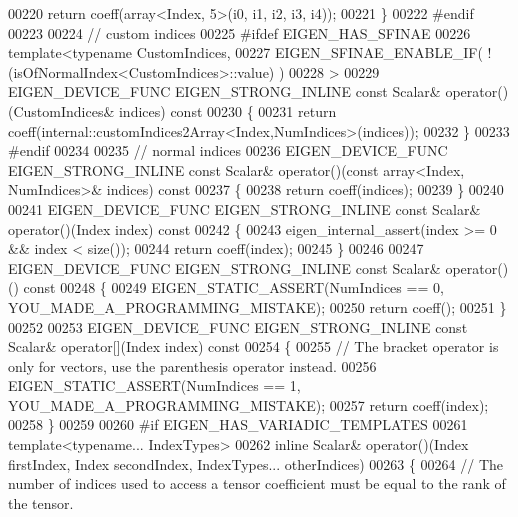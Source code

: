 \begin{DoxyCode}
00220       \textcolor{keywordflow}{return} coeff(array<Index, 5>(i0, i1, i2, i3, i4));
00221     \}
00222 \textcolor{preprocessor}{#endif}
00223 
00224     \textcolor{comment}{// custom indices}
00225 \textcolor{preprocessor}{#ifdef EIGEN\_HAS\_SFINAE}
00226     \textcolor{keyword}{template}<\textcolor{keyword}{typename} CustomIndices,
00227              EIGEN\_SFINAE\_ENABLE\_IF( !(isOfNormalIndex<CustomIndices>::value) )
00228     >
00229     EIGEN\_DEVICE\_FUNC EIGEN\_STRONG\_INLINE \textcolor{keyword}{const} Scalar& operator()(CustomIndices& indices)\textcolor{keyword}{ const}
00230 \textcolor{keyword}{    }\{
00231         \textcolor{keywordflow}{return} coeff(internal::customIndices2Array<Index,NumIndices>(indices));
00232     \}
00233 \textcolor{preprocessor}{#endif}
00234 
00235     \textcolor{comment}{// normal indices}
00236     EIGEN\_DEVICE\_FUNC EIGEN\_STRONG\_INLINE \textcolor{keyword}{const} Scalar& operator()(\textcolor{keyword}{const} array<Index, NumIndices>& indices)\textcolor{keyword}{
       const}
00237 \textcolor{keyword}{    }\{
00238       \textcolor{keywordflow}{return} coeff(indices);
00239     \}
00240 
00241     EIGEN\_DEVICE\_FUNC EIGEN\_STRONG\_INLINE \textcolor{keyword}{const} Scalar& operator()(Index index)\textcolor{keyword}{ const}
00242 \textcolor{keyword}{    }\{
00243       eigen\_internal\_assert(index >= 0 && index < size());
00244       \textcolor{keywordflow}{return} coeff(index);
00245     \}
00246 
00247     EIGEN\_DEVICE\_FUNC EIGEN\_STRONG\_INLINE \textcolor{keyword}{const} Scalar& operator()()\textcolor{keyword}{ const}
00248 \textcolor{keyword}{    }\{
00249       EIGEN\_STATIC\_ASSERT(NumIndices == 0, YOU\_MADE\_A\_PROGRAMMING\_MISTAKE);
00250       \textcolor{keywordflow}{return} coeff();
00251     \}
00252 
00253     EIGEN\_DEVICE\_FUNC EIGEN\_STRONG\_INLINE \textcolor{keyword}{const} Scalar& operator[](Index index)\textcolor{keyword}{ const}
00254 \textcolor{keyword}{    }\{
00255       \textcolor{comment}{// The bracket operator is only for vectors, use the parenthesis operator instead.}
00256       EIGEN\_STATIC\_ASSERT(NumIndices == 1, YOU\_MADE\_A\_PROGRAMMING\_MISTAKE);
00257       \textcolor{keywordflow}{return} coeff(index);
00258     \}
00259 
00260 \textcolor{preprocessor}{#if EIGEN\_HAS\_VARIADIC\_TEMPLATES}
00261     \textcolor{keyword}{template}<\textcolor{keyword}{typename}... IndexTypes>
00262     \textcolor{keyword}{inline} Scalar& operator()(Index firstIndex, Index secondIndex, IndexTypes... otherIndices)
00263     \{
00264       \textcolor{comment}{// The number of indices used to access a tensor coefficient must be equal to the rank of the tensor.}

\end{DoxyCode}
